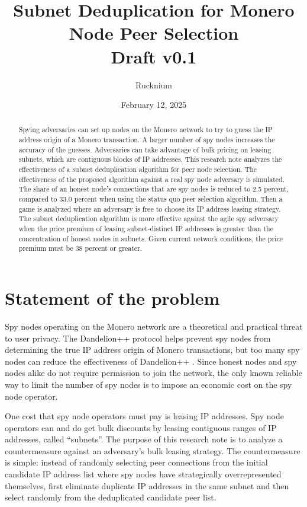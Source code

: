 \documentclass[usletter,11pt,english,openany]{article}
\begin{document}
\title{Subnet Deduplication for Monero Node Peer Selection\\\vspace{.3cm}
\large Draft v0.1\vspace{-.715cm}}
\author{Rucknium }
\date{February 12, 2025}
\maketitle
\begin{abstract}
Spying adversaries can set up nodes on the Monero network to try to
guess the IP address origin of a Monero transaction. A larger number
of spy nodes increases the accuracy of the guesses. Adversaries can
take advantage of bulk pricing on leasing subnets, which are contiguous
blocks of IP addresses. This research note analyzes the effectiveness
of a subnet deduplication algorithm for peer node selection. The effectiveness
of the proposed algorithm against a real spy node adversary is simulated.
The share of an honest node's connections that are spy nodes is reduced
to 2.5 percent, compared to 33.0 percent when using the status quo
peer selection algorithm. Then a game is analyzed where an adversary
is free to choose its IP address leasing strategy. The subnet deduplication
algorithm is more effective against the agile spy adversary when the
price premium of leasing subnet-distinct IP addresses is greater than
the concentration of honest nodes in subnets. Given current network
conditions, the price premium must be 38 percent or greater.
\end{abstract}

\section{Statement of the problem}

Spy nodes operating on the Monero network are a theoretical and practical
threat to user privacy. The Dandelion++ protocol helps prevent spy
nodes from determining the true IP address origin of Monero transactions,
but too many spy nodes can reduce the effectiveness of Dandelion++
\cite{Fanti2018a}. Since honest nodes and spy nodes alike do not
require permission to join the network, the only known reliable way
to limit the number of spy nodes is to impose an economic cost on
the spy node operator.

One cost that spy node operators must pay is leasing IP addresses.
Spy node operators can and do get bulk discounts by leasing contiguous
ranges of IP addresses, called ``subnets''. The purpose of this
research note is to analyze a countermeasure against an adversary's
bulk leasing strategy. The countermeasure is simple: instead of randomly
selecting peer connections from the initial candidate IP address list
where spy nodes have strategically overrepresented themselves, first
eliminate duplicate IP addresses in the same subnet and then select
randomly from the deduplicated candidate peer list.
\end{document}
